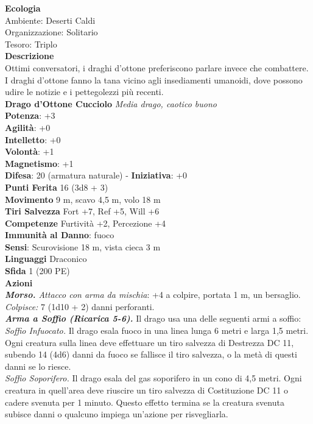 \begin{multicols}{2}
\textbf{Ecologia}\\
Ambiente: Deserti Caldi\\
Organizzazione: Solitario\\
Tesoro: Triplo\\
\textbf{Descrizione}\\
Ottimi conversatori, i draghi d’ottone preferiscono parlare invece che combattere. I draghi d’ottone fanno la tana vicino agli insediamenti umanoidi, dove possono udire le notizie e i pettegolezzi più recenti.\\


\medskip\textbf{Drago d'Ottone Cucciolo}
\emph{Media drago, caotico buono}\\
\textbf{Potenza}: +3\\
\textbf{Agilità}: +0\\
\textbf{Intelletto}: +0\\
\textbf{Volontà}: +1\\
\textbf{Magnetismo}: +1\\
\textbf{Difesa}: 20 (armatura naturale) - \textbf{Iniziativa}: +0\\
\textbf{Punti Ferita} 16 (3d8 + 3)\\
\textbf{Movimento} 9 m, scavo 4,5 m, volo 18 m\\
\textbf{Tiri Salvezza} Fort +7, Ref +5, Will +6\\
\textbf{Competenze} Furtività +2, Percezione +4\\
\textbf{Immunità al Danno}: fuoco\\
\textbf{Sensi}: Scurovisione 18 m, vista cieca 3 m\\
\textbf{Linguaggi} Draconico\\
\textbf{Sfida} 1 (200 PE)\smallskip\\
\smallskip\textbf{Azioni}\\
\emph{\textbf{Morso.} Attacco con arma da mischia}: +4 a colpire, portata 1 m, un bersaglio.\\
\emph{Colpisce:} 7 (1d10 + 2) danni perforanti.\\
\emph{\textbf{Arma a Soffio (Ricarica 5-6).}} Il drago usa una delle seguenti armi a soffio:\\
\emph{Soffio Infuocato.} Il drago esala fuoco in una linea lunga 6 metri e larga 1,5 metri. Ogni creatura sulla linea deve effettuare un tiro salvezza di Destrezza DC 11, subendo 14 (4d6) danni da fuoco se fallisce il tiro salvezza, o la metà di questi danni se lo riesce.\\
\emph{Soffio Soporifero.} Il drago esala del gas soporifero in un cono di 4,5 metri. Ogni creatura in quell'area deve riuscire un tiro salvezza di Costituzione DC 11 o cadere svenuta per 1 minuto. Questo effetto termina se la creatura svenuta subisce danni o qualcuno impiega un'azione per risvegliarla.\\

\end{multicols}

